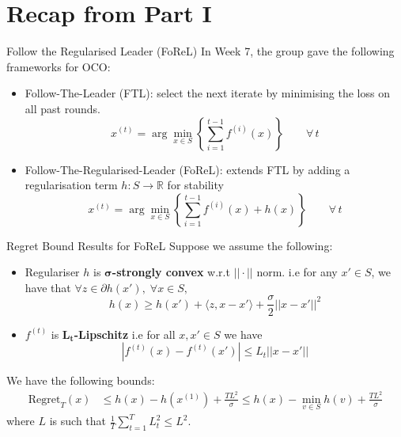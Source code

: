 \documentclass{beamer}
\begin{document}
\section{Recap from Part I}
\begin{frame}{Follow the Regularised Leader (FoReL)}
In Week 7, the group gave the following frameworks for OCO:
\begin{itemize}
    \item Follow-The-Leader (FTL): 
    select the next iterate by minimising the loss on all past rounds.
    \begin{equation}
         x^{(t)} = \arg \min_{x \in S} \left\{\sum_{i = 1}^{t-1} f^{(i)}(x)\right\}\qquad\forall\,t
    \end{equation}
    \item Follow-The-Regularised-Leader (FoReL):
    extends FTL by adding a regularisation term $h: S \to \mathbb R$ for stability
    \begin{equation}
        x^{(t)} = \arg \min_{x \in S} \left\{\sum_{i = 1}^{t-1} f^{(i)}(x) + h(x)\right\}\qquad\forall\,t
    \end{equation}
\end{itemize}
\end{frame}

\begin{frame}{Regret Bound Results for FoReL}
Suppose we assume the following:
\begin{itemize}
    \item Regulariser $h$ is $\boldsymbol{\sigma}$\textbf{-strongly convex} w.r.t $||\cdot||$ norm.
    i.e for any $x' \in S$, we have that $\forall z \in \partial h(x'),\;\forall x \in S,$\begin{equation*}
         h(x) \geq h(x') + \langle z, x - x' \rangle + \frac{\sigma}{2} || x - x' ||^2
    \end{equation*}
    \item $f^{(t)}$ is $\mathbf{L_t}$\textbf{-Lipschitz} i.e for all $x, x' \in S$ we have $$|f^{(t)}(x) - f^{(t)}(x')| \leq L_t||x-x'||$$
\end{itemize}
We have the following bounds:
        \begin{equation}\label{eqn:forel_regre_with_min}
        \begin{aligned}
    \text{Regret}_T(x) &\leq h(x) - h(x^{(1)}) + \frac{TL^2}{\sigma} \leq h(x) - \min_{v \in S} h(v) + \frac{TL^2}{\sigma}
    \end{aligned}
\end{equation} 
where $L$ is such that $\frac{1}{T}\sum_{t=1}^T L_t^2 \leq L^2$.
\end{frame}
\end{document}
